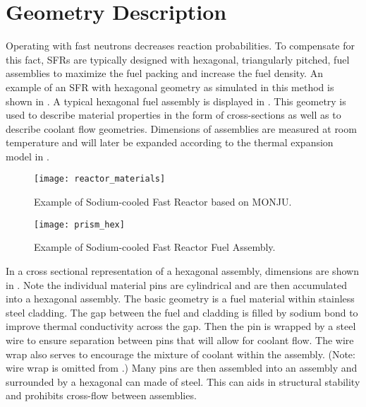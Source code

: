 \section{Geometry Description}
  \label{sec:geometry_description}
  Operating with fast neutrons decreases reaction probabilities. To compensate
  for this fact, SFRs are typically designed with hexagonal,
  triangularly pitched, fuel assemblies to maximize the fuel packing and
  increase the fuel density. An example of an SFR with hexagonal geometry as
  simulated in this method is shown in .
  A typical hexagonal fuel assembly is displayed in .
  This geometry is used to describe material properties in the form of 
  cross-sections as well as to describe coolant flow geometries. Dimensions of 
  assemblies are measured at room temperature and will later be expanded 
  according to the thermal expansion model in .
  
  \begin{figure}
    \centering
    \texttt{[image: reactor\_materials]}
    \caption{Example of Sodium-cooled Fast Reactor based on MONJU.}
    \label{fig:reactor_materials}
  \end{figure}

  \begin{figure}
    \centering
    \texttt{[image: prism\_hex]}
    \caption{Example of Sodium-cooled Fast Reactor Fuel Assembly.}
    \label{fig:prism_hex}
  \end{figure}

  In a cross sectional representation of a hexagonal assembly, dimensions are 
  shown in . 
  Note the individual material pins are cylindrical and are then accumulated
  into a hexagonal assembly. The basic geometry is a fuel material within
  stainless steel cladding. The gap between the fuel and cladding is filled by
  sodium bond to improve thermal conductivity across the gap. Then the pin is
  wrapped by a steel wire to ensure separation between pins that will allow for
  coolant flow. The wire wrap also serves to encourage the mixture of coolant
  within the assembly. (Note: wire wrap is omitted from .) 
  Many pins are then assembled into an assembly and surrounded by a hexagonal 
  can made of steel. This can aids in structural stability and prohibits 
  cross-flow between assemblies. 

